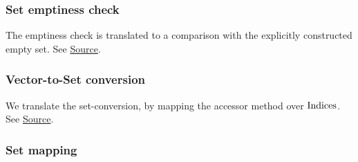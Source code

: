 \subsubsection{ Set emptiness check}


\begin{mathpar}
\end{mathpar}

The emptiness check is translated to a comparison with the explicitly
constructed empty set. See
\href{https://github.com/saltiniroberto/ssf/blob/7ea6e18093d9da3154b4e396dd435549f687e6b9/high_level/common/pythonic_code_generic.py#L83-L84}{Source}.


\subsubsection{Vector-to-Set conversion}


\begin{mathpar}
\end{mathpar}

We translate the set-conversion, by mapping the accessor method over
$\Indices$. See
\href{https://github.com/saltiniroberto/ssf/blob/7ea6e18093d9da3154b4e396dd435549f687e6b9/high_level/common/pythonic_code_generic.py#L87-L88}{Source}.


\subsubsection{Set mapping}


